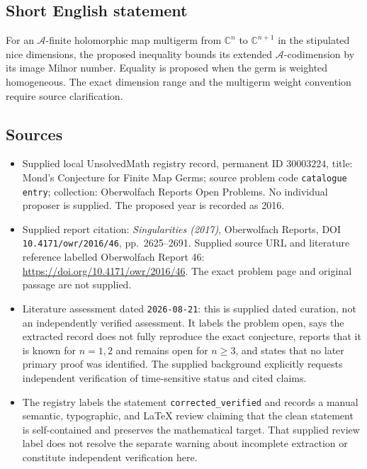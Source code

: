 \documentclass[11pt]{article}
\newcommand{\C}{\mathbb{C}}
\begin{document}
\subsection{Short English statement}
For an \(\mathcal A\)-finite holomorphic map multigerm from \(\C^n\) to \(\C^{n+1}\) in the stipulated nice dimensions, the proposed inequality bounds its extended \(\mathcal A\)-codimension by its image Milnor number. Equality is proposed when the germ is weighted homogeneous. The exact dimension range and the multigerm weight convention require source clarification.
\subsection{Sources}
\begin{itemize}
\item Supplied local UnsolvedMath registry record, permanent ID \(30003224\), title: Mond's Conjecture for Finite Map Germs; source problem code \texttt{catalogue entry}; collection: Oberwolfach Reports Open Problems. No individual proposer is supplied. The proposed year is recorded as 2016.
\item Supplied report citation: \emph{Singularities (2017)}, Oberwolfach Reports, DOI \texttt{10.4171/owr/2016/46}, pp.\ 2625--2691. Supplied source URL and literature reference labelled Oberwolfach Report 46: \url{https://doi.org/10.4171/owr/2016/46}. The exact problem page and original passage are not supplied.
\item Literature assessment dated \texttt{2026-08-21}: this is supplied dated curation, not an independently verified assessment. It labels the problem open, says the extracted record does not fully reproduce the exact conjecture, reports that it is known for \(n=1,2\) and remains open for \(n\geq3\), and states that no later primary proof was identified. The supplied background explicitly requests independent verification of time-sensitive status and cited claims.
\item The registry labels the statement \texttt{corrected\_verified} and records a manual semantic, typographic, and LaTeX review claiming that the clean statement is self-contained and preserves the mathematical target. That supplied review label does not resolve the separate warning about incomplete extraction or constitute independent verification here.
\end{itemize}
\end{document}

